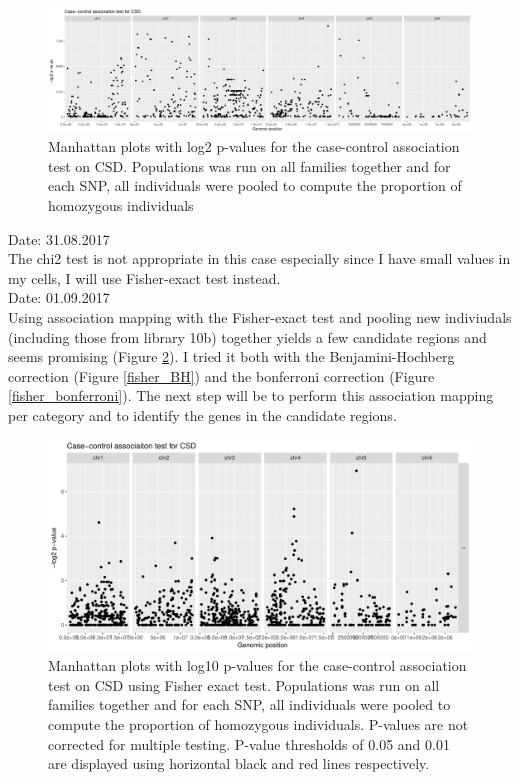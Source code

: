 \documentclass[10pt,a4paper]{report}
\begin{document}
\begin{figure}[h]
	\begin{center}
		\includegraphics[width=\textwidth]{association_mapping/naive_case_control_grouped.pdf}
		\caption{Manhattan plots with log2 p-values for the case-control association test on CSD. Populations was run on all families together and for each SNP, all individuals were pooled to compute the proportion of homozygous individuals}
		\label{naive_case_control}
	\end{center}
\end{figure}

Date: 31.08.2017\\
The chi2 test is not appropriate in this case especially since I have small values in my cells, I will use Fisher-exact test instead.\\
Date: 01.09.2017\\
Using association mapping with the Fisher-exact test and pooling new indiviudals (including those from library 10b) together yields a few candidate regions and seems promising (Figure \ref{assoc_fisher}). I tried it both with the Benjamini-Hochberg correction (Figure \ref{fisher_BH}) and the bonferroni correction (Figure \ref{fisher_bonferroni}). The next step will be to perform this association mapping per category and to identify the genes in the candidate regions.

\begin{figure}[h]
	\begin{center}
		\includegraphics[width=\textwidth]{association_mapping/fisher_no_corr.pdf}
		\caption{Manhattan plots with log10 p-values for the case-control association test on CSD using Fisher exact test. Populations was run on all families together and for each SNP, all individuals were pooled to compute the proportion of homozygous individuals. P-values are not corrected for multiple testing. P-value thresholds of 0.05 and 0.01 are displayed using horizontal black and red lines respectively.}
		\label{assoc_fisher}
	\end{center}
\end{figure}
\end{document}
